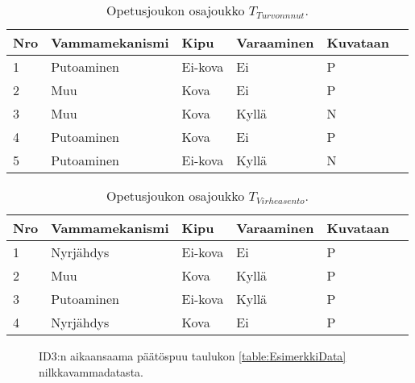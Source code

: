 \documentclass[12pt,finnish]{tktltiki2}
\theoremstyle{definition}
\theoremstyle{remark}
\begin{document}
\begin{table}
\centering
    \begin{tabular}{ | l | l | l | l | l | p{2cm} |} \hline
    \textbf{Nro} & \textbf{Vammamekanismi} & \textbf{Kipu} & \textbf{Varaaminen} & \textbf{Kuvataan} \\ \hline
    1 & Putoaminen & Ei-kova & Ei & P \\ \hline
    2 & Muu & Kova & Ei & P \\ \hline
    3 & Muu & Kova & Kyllä & N \\ \hline
    4 & Putoaminen & Kova & Ei & P \\ \hline
    5 & Putoaminen & Ei-kova & Kyllä & N \\ \hline
    \end{tabular}
\caption{Opetusjoukon osajoukko $T_{Turvonnnut}$.}
\label{table:OsajoukkoTTurvonnut}
\end{table}

\begin{table}
\centering
    \begin{tabular}{ | l | l | l | l | l | p{2cm} |} \hline
    \textbf{Nro} & \textbf{Vammamekanismi} & \textbf{Kipu} & \textbf{Varaaminen} & \textbf{Kuvataan} \\ \hline
    1 & Nyrjähdys & Ei-kova & Ei & P \\ \hline
    2 & Muu & Kova & Kyllä & P \\ \hline
    3 & Putoaminen & Ei-kova & Kyllä & P \\ \hline
    4 & Nyrjähdys & Kova & Ei & P \\ \hline
    \end{tabular}
\caption{Opetusjoukon osajoukko $T_{Virheasento}$.}
\label{table:OsajoukkoTVirheasento}
\end{table}

\begin{figure}
\centering
{}
\caption{ID3:n aikaansaama päätöspuu taulukon \ref{table:EsimerkkiData} nilkkavammadatasta.}
\label{fig:NilkkavammaPaatospuu}
\end{figure}
\end{document}
